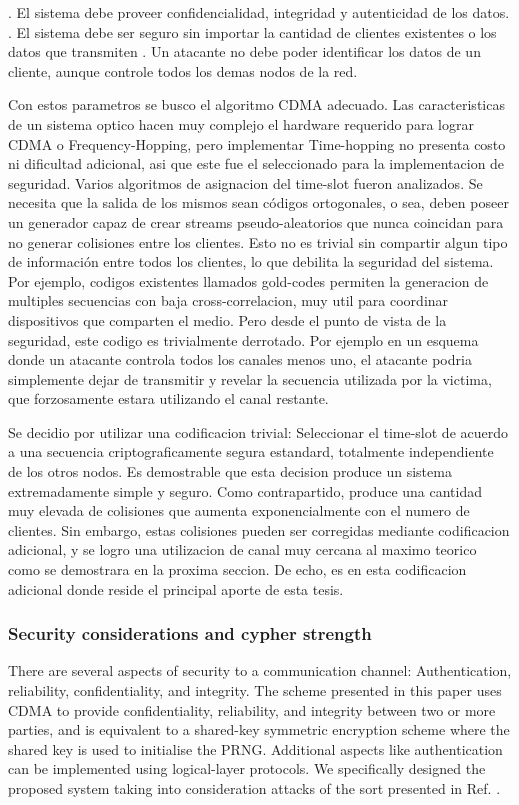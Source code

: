 . El sistema debe proveer confidencialidad, integridad y autenticidad de los datos.
. El sistema debe ser seguro sin importar la cantidad de clientes existentes o los datos que transmiten
. Un atacante no debe poder identificar los datos de un cliente, aunque controle todos los demas nodos de la red.

Con estos parametros se busco el algoritmo CDMA adecuado. Las caracteristicas de un sistema optico hacen muy complejo el hardware requerido para lograr CDMA o Frequency-Hopping, pero implementar Time-hopping no presenta costo ni dificultad adicional, asi que este fue el seleccionado para la implementacion de seguridad.
Varios algoritmos de asignacion del time-slot fueron analizados. Se necesita que la salida de los mismos sean códigos ortogonales, o sea, deben poseer un generador capaz de crear streams pseudo-aleatorios que nunca coincidan para no generar colisiones entre los clientes. Esto no es trivial sin compartir algun tipo de información entre todos los clientes, lo que debilita la seguridad del sistema. Por ejemplo, codigos existentes llamados gold-codes permiten la generacion de multiples secuencias con baja cross-correlacion, muy util para coordinar dispositivos que comparten el medio. Pero desde el punto de vista de la seguridad, este codigo es trivialmente derrotado. Por ejemplo en un esquema donde un atacante controla todos los canales menos uno, el atacante podria simplemente dejar de transmitir y revelar la secuencia utilizada por la victima, que forzosamente estara utilizando el canal restante.

Se decidio por utilizar una codificacion trivial: Seleccionar el time-slot de acuerdo a una secuencia criptograficamente segura estandard, totalmente independiente de los otros nodos. Es demostrable que esta decision produce un sistema extremadamente simple y seguro. Como contrapartido, produce una cantidad muy elevada de colisiones que aumenta exponencialmente con el numero de clientes. Sin embargo, estas colisiones pueden ser corregidas mediante codificacion adicional, y se logro una utilizacion de canal muy cercana al maximo teorico como se demostrara en la proxima seccion. De echo, es en esta codificacion adicional donde reside el principal aporte de esta tesis.

\subsubsection{Security considerations and cypher strength}\label{security}
There are several aspects of security to a communication channel: Authentication, reliability, confidentiality, and integrity.
The scheme presented in this paper uses CDMA to provide confidentiality, reliability, and integrity between two or more parties, and is equivalent to a shared-key symmetric encryption scheme where the shared key is used to initialise the PRNG.
Additional aspects like authentication can be implemented using logical-layer protocols.
We specifically designed the proposed system taking into consideration attacks of the sort presented in Ref. \cite{Shake:05}.

